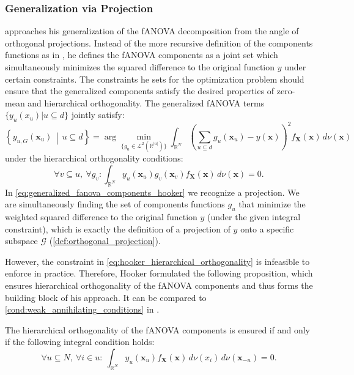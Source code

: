 \subsubsection{Generalization via Projection}
\cite{hooker2007} approaches his generalization of the fANOVA decomposition from the angle of orthogonal projections. Instead of the more recursive definition of the components functions as in \cite{rahman2014}, he defines the fANOVA components as a joint set which simultaneously minimizes the squared difference to the original function $y$ under certain constraints.
The constraints he sets for the optimization problem should ensure that the generalized components satisfy the desired properties of zero-mean and hierarchical orthogonality.
The generalized fANOVA terms $\{y_u(x_u) | u \subseteq d \}$ jointly satisfy:
\begin{equation}
\left\{ y_{u, G}(\boldsymbol{x}_u) \,\middle|\, u \subseteq d \right\}
= \arg\min_{\{g_u \in \mathcal{L}^2(\mathbb{R}^{|u|})\}} 
\int_{\mathbb{R}^N} \left( \sum_{u \subseteq d} g_u(\boldsymbol{x}_u) - y(\boldsymbol{x}) \right)^2 f_{\boldsymbol{X}}(\boldsymbol{x}) \, d \nu (\boldsymbol{x})
\label{eq:generalized_fanova_components_hooker}
\end{equation}
under the hierarchical orthogonality conditions:
\begin{equation}
    \forall v \subseteq u,\ \forall g_v : \int_{\mathbb{R}^N} y_u(\boldsymbol{x}_u) g_v(\boldsymbol{x}_v) f_{\boldsymbol{X}}(\boldsymbol{x}) \, d \nu (\boldsymbol{x}) = 0.
\label{eq:hooker_hierarchical_orthogonality}
\end{equation}
In \autoref{eq:generalized_fanova_components_hooker} we recognize a projection. We are simultaneously finding the set of components functions $g_u$ that minimize the weighted squared difference to the original function $y$ (under the given integral constraint), which is exactly the definition of a projection of $y$ onto a specific subspace $\mathcal{G}$ (\autoref{def:orthogonal_projection}).\par
However, the constraint in \autoref{eq:hooker_hierarchical_orthogonality} is infeasible to enforce in practice. 
Therefore, Hooker formulated the following proposition, which ensures hierarchical orthogonality of the fANOVA components and thus forms the building block of his approach. It can be compared to \autoref{cond:weak_annihilating_conditions} in \cite{rahman2014}.
\begin{proposition}
    The hierarchical orthogonality of the fANOVA components is ensured if and only if the following integral condition holds:
    \begin{equation}
\forall u \subseteq N,\ \forall i \in u:\ \int_{\mathbb{R}^N} y_u(\boldsymbol{x}_u) f_{\boldsymbol{X}}(\boldsymbol{x})\, d \nu (x_i)\, d \nu (\boldsymbol{x}_{-u}) = 0.
\end{equation}
\label{prop:hooker_lemma_1}
\end{proposition}
